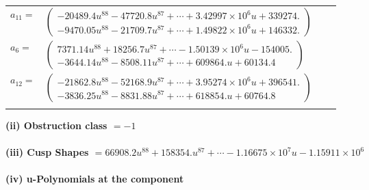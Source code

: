 \documentclass[1p]{elsarticle_modified}
\theoremstyle{definition}
\begin{document}
\begin{tabular}{m{7pt} m{180pt} m{7pt} m{180pt} }
\flushright $a_{11}=$&$\begin{pmatrix}-20489.4 u^{88}-47720.8 u^{87}+\cdots+3.42997\times10^{6} u+339274.\\-9470.05 u^{88}-21709.7 u^{87}+\cdots+1.49822\times10^{6} u+146332.\end{pmatrix}$ \\
\flushright $a_{6}=$&$\begin{pmatrix}7371.14 u^{88}+18256.7 u^{87}+\cdots-1.50139\times10^{6} u-154005.\\-3644.14 u^{88}-8508.11 u^{87}+\cdots+609864. u+60134.4\end{pmatrix}$ \\
\flushright $a_{12}=$&$\begin{pmatrix}-21862.8 u^{88}-52168.9 u^{87}+\cdots+3.95274\times10^{6} u+396541.\\-3836.25 u^{88}-8831.88 u^{87}+\cdots+618854. u+60764.8\end{pmatrix}$\\&\end{tabular}
\flushleft \textbf{(ii) Obstruction class $= -1$}\\~\\
\flushleft \textbf{(iii) Cusp Shapes $= 66908.2 u^{88}+158354. u^{87}+\cdots-1.16675\times10^{7} u-1.15911\times10^{6}$}\\~\\
\newpage\renewcommand{\arraystretch}{1}
\flushleft \textbf{(iv) u-Polynomials at the component}\newline \\
\end{document}
